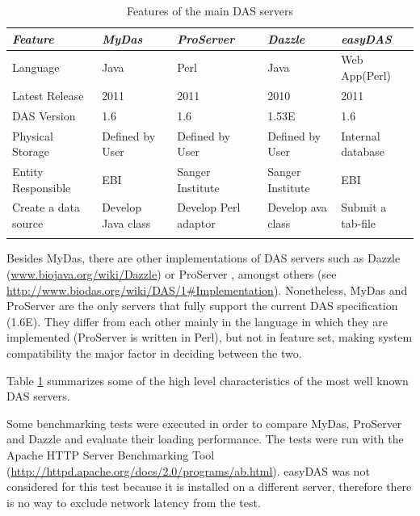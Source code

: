 \begin{table}[t]
        \begin{tabular}{| l | l | l | l | l |}
\hline \rowcolor{table_header}
\emph{Feature} & \emph{MyDas} & \emph{ProServer} & \emph{Dazzle} & \emph{easyDAS}\\
\hline \rowcolor{row_odd}
Language & Java & Perl & Java & Web App(Perl)\\
\hline \rowcolor{row_even}
Latest Release & 2011 & 2011 & 2010 & 2011\\
\hline \rowcolor{row_odd}
DAS Version & 1.6 & 1.6 & 1.53E\footnotemark  & 1.6\\
\hline \rowcolor{row_even}
Physical Storage & Defined by User & Defined by User & Defined by User & Internal database\\
\hline \rowcolor{row_odd}
Entity Responsible & EBI & Sanger Institute & Sanger Institute & EBI\\
\hline \rowcolor{row_even}
Create a data source & Develop Java class & Develop Perl adaptor & Develop ava class & Submit a tab-file\\
\hline \rowcolor{row_odd}
        \end{tabular}
        \caption{Features of the main DAS servers}
        \label{tab:table1}
\end{table}

Besides MyDas, there are other implementations of DAS servers such as Dazzle (\url{www.biojava.org/wiki/Dazzle}) or ProServer \cite{FIN2007},  amongst others (see \url{http://www.biodas.org/wiki/DAS/1#Implementation}). Nonetheless, MyDas and ProServer are the only servers that fully support the current DAS specification (1.6E). They differ from each other mainly in the language in which they are implemented (ProServer is written in Perl), but not in feature set, making system compatibility the major factor in deciding between the two.

Table \ref{tab:table1} summarizes some of the high level characteristics of the most well known DAS servers.


Some benchmarking tests were executed in order to compare  MyDas, ProServer and Dazzle and evaluate their loading performance. The tests were run with the Apache HTTP Server Benchmarking Tool (\url{http://httpd.apache.org/docs/2.0/programs/ab.html}).  easyDAS was not considered for this test because it is installed on a different server, therefore there is no way to exclude network latency from the test.

